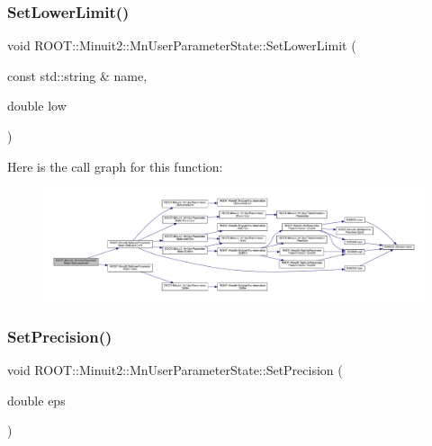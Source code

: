 \subsubsection{\texorpdfstring{SetLowerLimit()}{SetLowerLimit()}\hspace{0.1cm}{\footnotesize\ttfamily [6/6]}}
{\footnotesize\ttfamily void R\+O\+O\+T\+::\+Minuit2\+::\+Mn\+User\+Parameter\+State\+::\+Set\+Lower\+Limit (\begin{DoxyParamCaption}\item[{const std\+::string \&}]{name,  }\item[{double}]{low }\end{DoxyParamCaption})}

Here is the call graph for this function\+:
\nopagebreak
\begin{figure}[H]
\begin{center}
\leavevmode
\includegraphics[width=350pt]{d3/de0/classROOT_1_1Minuit2_1_1MnUserParameterState_afc9466eb6db8e8f07309dcd7a760d116_cgraph}
\end{center}
\end{figure}
\mbox{\label{classROOT_1_1Minuit2_1_1MnUserParameterState_aab7787768e533471839387ef51a75cbb}} 
\subsubsection{\texorpdfstring{SetPrecision()}{SetPrecision()}\hspace{0.1cm}{\footnotesize\ttfamily [1/3]}}
{\footnotesize\ttfamily void R\+O\+O\+T\+::\+Minuit2\+::\+Mn\+User\+Parameter\+State\+::\+Set\+Precision (\begin{DoxyParamCaption}\item[{double}]{eps }\end{DoxyParamCaption})}

\mbox{\label{classROOT_1_1Minuit2_1_1MnUserParameterState_aab7787768e533471839387ef51a75cbb}} 
